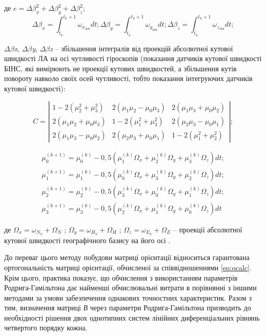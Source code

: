 \begin{ESKDexplanation}
\item де   $e=\Delta \beta_{x}^{2} +\Delta \beta_{y}^{2} +\Delta \beta_{z}^{2} ;$
\[\Delta \beta_{x} =\int_{t_{k} }^{t_{k} +1}\omega_{x_{\text{ЛА}} } dt ;   
 \Delta \beta_{y} =\int_{t_{k} }^{t_{k} +1}\omega_{y_{\text{ЛА}} } dt ;   
 \Delta \beta_{z} =\int_{t_{k} }^{t_{k} +1}\omega_{z_{\text{ЛА}} } dt ;\] 

\item $\Delta $$\beta $\textit{x}, $\Delta $$\beta $\textit{y}, $\Delta $$\beta $\textit{z }-- збільшення 
інтегралів від проекцій абсолютної кутової швидкості ЛА на осі чутливості гіроскопів 
(показання датчиків кутової швидкості БІНС, які вимірюють не проекції кутових швидкостей, 
а збільшення кутів повороту навколо своїх осей чутливості, тобто показання інтегруючих 
датчиків кутової швидкості):
\end{ESKDexplanation}
\[C=\left|\begin{array}{ccc} 
{1-2(\mu_{2}^{2} +\mu_{3}^{2} )} & {2(\mu_{1} \mu_{2} -\mu_{0} \mu_{3} )} & {2(\mu_{1} \mu_{3} +\mu_{0} \mu_{2} )} \\ 
{2(\mu_{1} \mu_{2} +\mu_{0} \mu_{3} )} & {1-2(\mu_{1}^{2} +\mu_{3}^{2} )} & {2(\mu_{2} \mu_{3} -\mu_{0} \mu_{1} )} \\ 
{2(\mu_{1} \mu_{3} -\mu_{0} \mu_{2} )} & {2(\mu_{2} \mu_{3} +\mu_{0} \mu_{1} )} & {1-2(\mu_{1}^{2} +\mu_{2}^{2} )} 
\end{array}  \right|;\] 

\[\begin{array}{l} 
{\mu_{0}^{(k+1)}=\mu_{0}^{(k)} -0,5\left(\mu_{1}^{(k)} \Omega_{x} +\mu_{2}^{(k)} \Omega_{y}+\mu_{3}^{(k)} \Omega_{z} \right) dt;}\\ 
{\mu_{1}^{(k+1)}=\mu_{1}^{(k)} -0,5\left(\mu_{0}^{(k)} \Omega_{x} +\mu_{3}^{(k)} \Omega_{y}+\mu_{2}^{(k)} \Omega_{z} \right) dt;} \\ 
{\mu_{2}^{(k+1)}=\mu_{2}^{(k)} -0,5\left(\mu_{3}^{(k)} \Omega_{x} +\mu_{0}^{(k)} \Omega_{y}+\mu_{1}^{(k)} \Omega_{z} \right) dt;} \\ 
{\mu_{3}^{(k+1)}=\mu_{3}^{(k)} -0,5\left(\mu_{2}^{(k)} \Omega_{x} +\mu_{1}^{(k)} \Omega_{y} +\mu_{0}^{(k)} \Omega_{z} \right) dt} 
\end{array}\] 

\begin{ESKDexplanation}
\item де $\Omega_{x} =\omega_{N_{V} } +\Omega_{N}$ ;  $\Omega_{y} =\omega_{H_{V} 
} +\Omega_{H}$ ;  $\Omega_{z} =\omega_{E_{V} } +\Omega_{E} $ -- проекції абсолютної 
кутової швидкості географічного базису на його осі .
\end{ESKDexplanation}
До переваг цього методу побудови матриці орієнтації відноситься гарантована ортогональність 
матриці орієнтації, обчисленої за співвідношеннями \eqref{eq:qcalc}. Крім цього, 
практика показує, що обчислення з використанням параметрів Родрига-Гамільтона дає 
найменші обчислювальні витрати в порівнянні з іншими методами за умови забезпечення 
однакових точностних характеристик. Разом з тим, визначення матриці \textit{В }через 
параметри Родрига-Гамільтона призводить до необхідності рішення двох однотипних систем 
лінійних диференціальних рівнянь четвертого порядку кожна.

